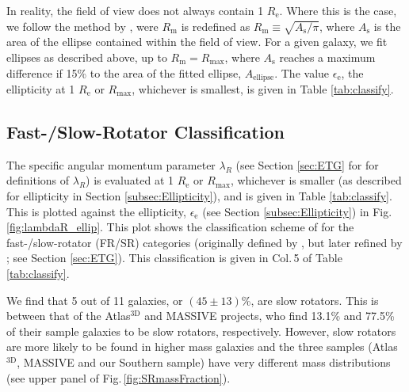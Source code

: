 			In reality, the field of view does not always contain 1 $R_\mathrm{e}$. Where this is the case, we follow the method by \citet{Emsellem2007}, were $R_\mathrm{m}$ is redefined as $R_\mathrm{m} \equiv \sqrt{A_\mathrm{s}/\pi}$, where $A_\mathrm{s}$ is the area of the ellipse contained within the field of view. For a given galaxy, we fit ellipses as described above, up to $R_\mathrm{m} = R_\mathrm{max}$, where $A_\mathrm{s}$ reaches a maximum difference if 15\% to the area of the fitted ellipse, $A_\text{ellipse}$. The value $\epsilon_\mathrm{e}$, the ellipticity at 1 $R_\mathrm{e}$ or $R_\text{max}$, whichever is smallest, is given in Table \ref{tab:classify}. 

		\subsection{Fast-/Slow-Rotator Classification}
			\label{subsec:FSRot}

			The specific angular momentum parameter $\lambda_R$ (see Section \ref{sec:ETG} for for definitions of $\lambda_R$) is evaluated at 1 $R_\mathrm{e}$ or $R_\text{max}$, whichever is smaller (as described for ellipticity in Section \ref{subsec:Ellipticity}), and is given in Table \ref{tab:classify}. This is plotted against the ellipticity, $\epsilon_\mathrm{e}$ (see Section \ref{subsec:Ellipticity}) in Fig.\,\ref{fig:lambdaR_ellip}. This plot shows the classification scheme of \citet{Cappellari2016} for the fast-/slow-rotator (FR/SR) categories (originally defined by \citealt{Emsellem2011}, but later refined by \citealt{Cappellari2016}; see Section \ref{sec:ETG}). This classification is given in Col.\,5 of Table \ref{tab:classify}.

			We find that 5 out of 11 galaxies, or $(45\pm13)$\%, are slow rotators. This is between that of the Atlas$^\text{3D}$ and MASSIVE projects, who find 13.1\% and 77.5\% of their sample galaxies to be slow rotators, respectively. However, slow rotators are more likely to be found in higher mass galaxies and the three samples (Atlas$^\text{3D}$, MASSIVE and our Southern sample) have very different mass distributions (see upper panel of Fig.\,\ref{fig:SRmassFraction}).

